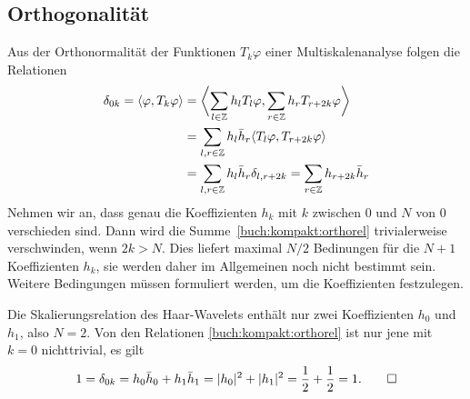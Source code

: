 \subsection{Orthogonalität}
Aus der Orthonormalität der Funktionen $T_k\varphi$ einer Multiskalenanalyse
folgen die Relationen
\begin{align}
\delta_{0k}
=
\langle \varphi,T_k \varphi\rangle
&=
\biggl\langle
\sum_{l\in\mathbb Z} h_lT_l\varphi,
\sum_{r\in\mathbb Z} h_rT_{r+2k}\varphi
\biggr\rangle
\notag
\\
&=
\sum_{l,r\in\mathbb Z} h_l\bar{h}_r \langle T_l\varphi, T_{r+2k}\varphi\rangle
\\
&=
\sum_{l,r\in\mathbb Z} h_l\bar{h}_r \delta_{l,r+2k}
=
\sum_{r\in\mathbb Z} h_{r+2k}\bar{h}_r
\label{buch:kompakt:orthorel}
\end{align}
Nehmen wir an, dass genau die Koeffizienten $h_k$ mit $k$ zwischen
$0$ und $N$ von $0$ verschieden sind.
Dann wird die Summe~\eqref{buch:kompakt:orthorel} trivialerweise
verschwinden, wenn $2k>N$.
Dies liefert maximal $N/2$ Bedinungen für die $N+1$ Koeffizienten
$h_k$, sie werden daher im Allgemeinen noch nicht bestimmt sein.
Weitere Bedingungen müssen formuliert werden, um die Koeffizienten
festzulegen.

\begin{beispiel}
Die Skalierungsrelation des Haar-Wavelets enthält nur zwei Koeffizienten
$h_0$ und $h_1$, also $N=2$.
Von den Relationen \eqref{buch:kompakt:orthorel} ist nur jene mit $k=0$
nichttrivial, es gilt
\[
1
=
\delta_{0k}
=
h_0\bar{h}_0 + h_1\bar{h}_1
=
|h_0|^2+|h_1|^2
=
\frac12+\frac12
=1.
\qedhere
\]
\end{beispiel}

